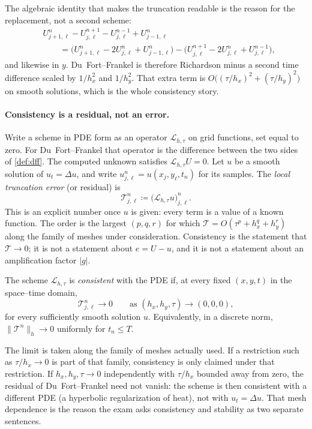 The algebraic identity that makes the truncation readable is the reason for the replacement, not a second scheme:
\[
\begin{aligned}
&U_{j+1,\ell}^n-U_{j,\ell}^{n+1}-U_{j,\ell}^{n-1}+U_{j-1,\ell}^n
\\
&\qquad=
\bigl(U_{j+1,\ell}^n-2U_{j,\ell}^n+U_{j-1,\ell}^n\bigr)
-
\bigl(U_{j,\ell}^{n+1}-2U_{j,\ell}^n+U_{j,\ell}^{n-1}\bigr),
\end{aligned}
\]
and likewise in \(y\). Du~Fort--Frankel is therefore Richardson minus a second time difference scaled by \(1/h_x^2\) and \(1/h_y^2\). That extra term is \(O\bigl((\tau/h_x)^2+(\tau/h_y)^2\bigr)\) on smooth solutions, which is the whole consistency story.

\paragraph{Consistency is a residual, not an error.}

\begin{definition}
\label{def:truncation}
Write a scheme in PDE form as an operator \(\mathcal L_{h,\tau}\) on grid functions, set equal to zero. For Du~Fort--Frankel that operator is the difference between the two sides of \cref{def:dff}. The computed unknown satisfies \(\mathcal L_{h,\tau}U=0\). Let \(u\) be a smooth solution of \(u_t=\Delta u\), and write \(u_{j,\ell}^n=u(x_j,y_\ell,t_n)\) for its samples. The \emph{local truncation error} (or residual) is
\[
\mathcal T_{j,\ell}^n
\coloneqq
\bigl(\mathcal L_{h,\tau}u\bigr)_{j,\ell}^n.
\]
This is an explicit number once \(u\) is given: every term is a value of a known function. The order is the largest \((p,q,r)\) for which \(\mathcal T=O(\tau^p+h_x^q+h_y^r)\) along the family of meshes under consideration. Consistency is the statement that \(\mathcal T\to 0\); it is not a statement about \(e=U-u\), and it is not a statement about an amplification factor \(|g|\).
\end{definition}

\begin{definition}[Consistency]
\label{def:consistency}
The scheme \(\mathcal L_{h,\tau}\) is \emph{consistent} with the PDE if, at every fixed \((x,y,t)\) in the space--time domain,
\[
\mathcal T_{j,\ell}^n
\to
0
\qquad
\text{as }
(h_x,h_y,\tau)\to(0,0,0),
\]
for every sufficiently smooth solution \(u\). Equivalently, in a discrete norm, \(\|\mathcal T^n\|_h\to 0\) uniformly for \(t_n\le T\).

The limit is taken along the family of meshes actually used. If a restriction such as \(\tau/h_x\to 0\) is part of that family, consistency is only claimed under that restriction. If \(h_x,h_y,\tau\to 0\) independently with \(\tau/h_x\) bounded away from zero, the residual of Du~Fort--Frankel need not vanish: the scheme is then consistent with a different PDE (a hyperbolic regularization of heat), not with \(u_t=\Delta u\). That mesh dependence is the reason the exam asks consistency and stability as two separate sentences.
\end{definition}

